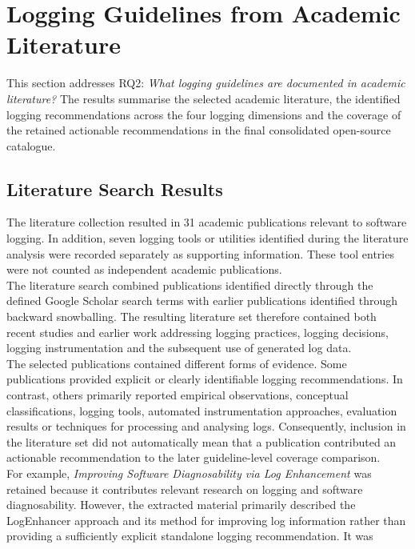 \section{Logging Guidelines from Academic Literature}
\label{sec:results-literature}
This section addresses RQ2: \textit{What logging guidelines are documented in
academic literature?}
The results summarise the selected academic literature, the identified logging
recommendations across the four logging dimensions and the coverage of the
retained actionable recommendations in the final consolidated open-source
catalogue.

\subsection{Literature Search Results}

The literature collection resulted in 31 academic publications relevant to software
logging. In addition, seven logging tools or utilities identified during the
literature analysis were recorded separately as supporting information. These tool
entries were not counted as independent academic publications.
\\
The literature search combined publications identified directly through the defined
Google Scholar search terms with earlier publications identified through backward
snowballing. The resulting literature set therefore contained both recent studies
and earlier work addressing logging practices, logging decisions, logging
instrumentation and the subsequent use of generated log data.
\\
The selected publications contained different forms of evidence. Some publications
provided explicit or clearly identifiable logging recommendations. In contrast, others
primarily reported empirical observations, conceptual classifications, logging
tools, automated instrumentation approaches, evaluation results or techniques for
processing and analysing logs. Consequently, inclusion in the literature set did
not automatically mean that a publication contributed an actionable recommendation
to the later guideline-level coverage comparison.
\\
For example, \textit{Improving Software Diagnosability via Log Enhancement} was
retained because it contributes relevant research on logging and software
diagnosability. However, the extracted material primarily described the
LogEnhancer approach and its method for improving log information rather than
providing a sufficiently explicit standalone logging recommendation. It was
